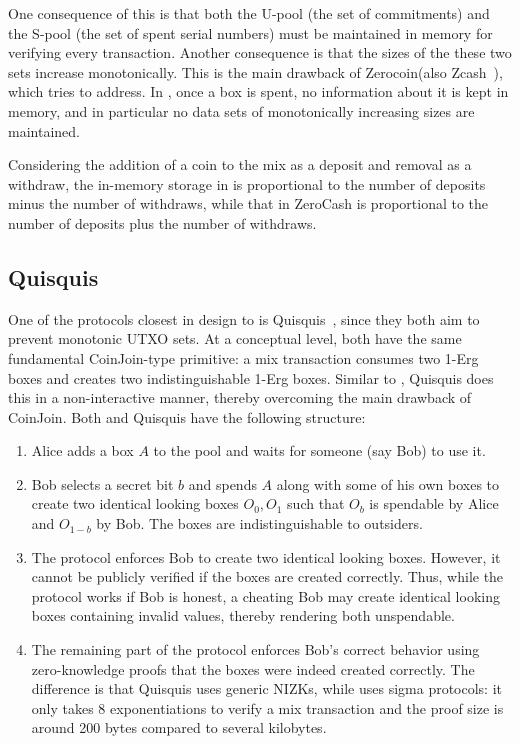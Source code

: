 \documentclass[runningheads]{llncs}
\newcommand{\zerocoin}{Zerocoin\xspace}
\begin{document}
One consequence of this is that both the U-pool (the set of commitments) and the S-pool (the set of spent serial numbers) must be maintained in memory for verifying every transaction. 
Another consequence is that the sizes of the these two sets increase monotonically. 
This is the main drawback of \zerocoin (also Zcash~\cite{zcash}), which \algname tries to address. 
In \algname, once a box is spent, no information about it is kept in memory, and in particular no data sets of monotonically increasing sizes are maintained. 

Considering the addition of a coin to the mix as a deposit and removal as a withdraw, the in-memory storage in \algname is proportional to the number of deposits minus the number of withdraws, while that in ZeroCash is proportional to the number of deposits plus the number of withdraws.  

\subsection{Quisquis}

One of the protocols closest in design to \algname is Quisquis~\cite{quisquis}, since they both aim to prevent monotonic UTXO sets. 
At a conceptual level, both have the same fundamental CoinJoin-type primitive: a mix transaction consumes two 1-Erg boxes and creates two indistinguishable
1-Erg boxes. Similar to \algname, Quisquis does this in a non-interactive manner, thereby overcoming the main drawback of CoinJoin. 
Both \algname and Quisquis have the following structure:
\begin{enumerate}
    \item Alice adds a box $A$ to the pool and waits for someone (say Bob) to use it. 
    \item Bob selects a secret bit $b$ and spends $A$ along with some of his own boxes to create two identical looking boxes $O_0, O_1$ such that $O_b$ is spendable by Alice and $O_{1-b}$ by Bob. The boxes are indistinguishable to outsiders. 
    \item The protocol enforces Bob to create two identical looking boxes. However, it cannot be publicly verified if the boxes are created correctly. Thus, while the protocol works if Bob is honest, a cheating Bob may create identical looking boxes containing invalid values, thereby rendering both unspendable. 
    \item The remaining part of the protocol enforces Bob's correct behavior using zero-knowledge proofs that the boxes were indeed created correctly.
    The difference is that Quisquis uses generic NIZKs, while \algname uses sigma protocols: it only takes 8 exponentiations to verify a \algname mix transaction and the proof size  is around 200 bytes compared to several kilobytes. 

\end{enumerate}
\end{document}
